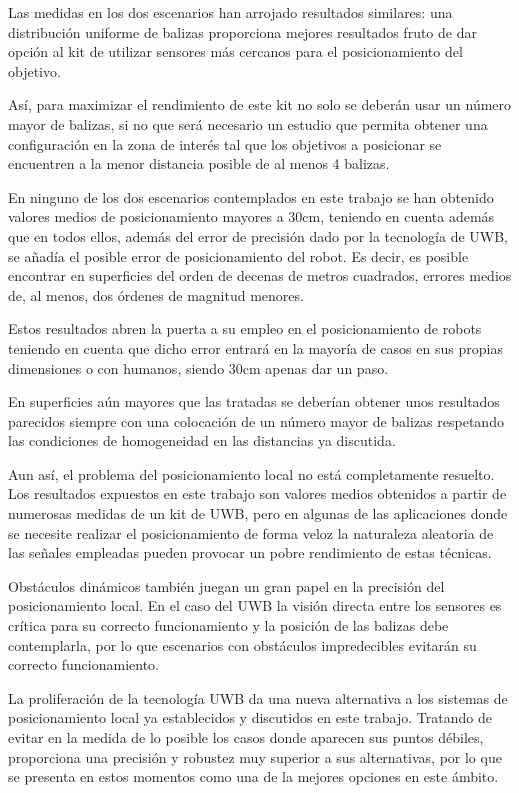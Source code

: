 Las medidas en los dos escenarios han arrojado resultados similares: una distribución uniforme de balizas proporciona mejores resultados fruto de dar opción al kit de utilizar sensores más cercanos para el posicionamiento del objetivo.

Así, para maximizar el rendimiento de este kit no solo se deberán usar un número mayor de balizas, si no que será necesario un estudio que permita obtener una configuración en la zona de interés tal que los objetivos a posicionar se encuentren a la menor distancia posible de al menos 4 balizas.

En ninguno de los dos escenarios contemplados en este trabajo se han obtenido valores medios de posicionamiento mayores a 30cm, teniendo en cuenta además que en todos ellos, además del error de precisión dado por la tecnología de UWB, se añadía el posible error de posicionamiento del robot.
Es decir, es posible encontrar en superficies del orden de decenas de metros cuadrados, errores medios de, al menos, dos órdenes de magnitud menores.

Estos resultados abren la puerta a su empleo en el posicionamiento de robots teniendo en cuenta que dicho error entrará en la mayoría de casos en sus propias dimensiones o con humanos, siendo 30cm apenas dar un paso.

En superficies aún mayores que las tratadas se deberían obtener unos resultados parecidos siempre con una colocación de un número mayor de balizas respetando las condiciones de homogeneidad en las distancias ya discutida.

Aun así, el problema del posicionamiento local no está completamente resuelto.
Los resultados expuestos en este trabajo son valores medios obtenidos a partir de numerosas medidas de un kit de UWB, pero en algunas de las aplicaciones donde se necesite realizar el posicionamiento de forma veloz la naturaleza aleatoria de las señales empleadas pueden provocar un pobre rendimiento de estas técnicas.

Obstáculos dinámicos también juegan un gran papel en la precisión del posicionamiento local.
En el caso del UWB la visión directa entre los sensores es crítica para su correcto funcionamiento y la posición de las balizas debe contemplarla, por lo que escenarios con obstáculos impredecibles evitarán su correcto funcionamiento.

La proliferación de la tecnología UWB da una nueva alternativa a los sistemas de posicionamiento local ya establecidos y discutidos en este trabajo.
Tratando de evitar en la medida de lo posible los casos donde aparecen sus puntos débiles, proporciona una precisión y robustez muy superior a sus alternativas, por lo que se presenta en estos momentos como una de la mejores opciones en este ámbito.